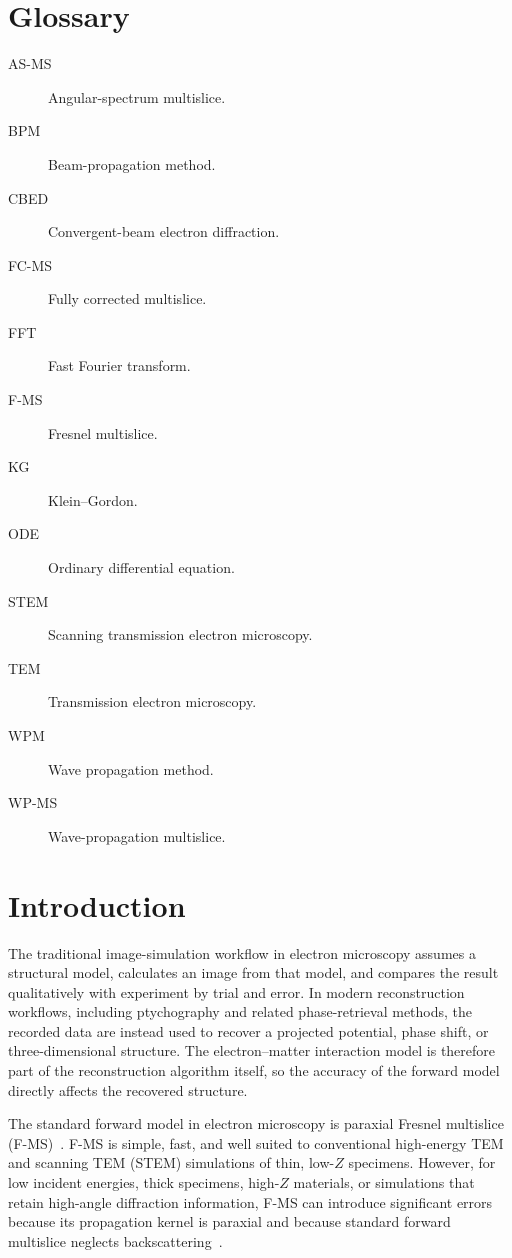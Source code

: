 \documentclass[preprint,12pt,number]{elsarticle}
\begin{document}
\section*{Glossary}
\begin{description}
\item[AS-MS] Angular-spectrum multislice.
\item[BPM] Beam-propagation method.
\item[CBED] Convergent-beam electron diffraction.
\item[FC-MS] Fully corrected multislice.
\item[FFT] Fast Fourier transform.
\item[F-MS] Fresnel multislice.
\item[KG] Klein--Gordon.
\item[ODE] Ordinary differential equation.
\item[STEM] Scanning transmission electron microscopy.
\item[TEM] Transmission electron microscopy.
\item[WPM] Wave propagation method.
\item[WP-MS] Wave-propagation multislice.
\end{description}

\section{Introduction}
\label{sec:introduction}

The traditional image-simulation workflow in electron microscopy assumes a
structural model, calculates an image from that model, and compares the result
qualitatively with experiment by trial and error. In modern reconstruction
workflows, including ptychography and related phase-retrieval methods, the
recorded data are instead used to recover a projected potential, phase shift,
or three-dimensional structure. The electron--matter interaction model is
therefore part of the reconstruction algorithm itself, so the accuracy of the
forward model directly affects the recovered structure. 

The standard forward model in electron microscopy is paraxial Fresnel multislice
(F-MS)~\cite{cowley1957scattering,ishizuka1977practical}. F-MS is simple, fast, and
well suited to conventional high-energy TEM and scanning TEM (STEM) simulations of thin,
low-$Z$ specimens. However, for low incident energies, thick specimens, high-$Z$ materials, or
simulations that retain high-angle diffraction information, F-MS can introduce
significant errors because its propagation kernel is paraxial and because
standard forward multislice neglects
backscattering~\cite{RotherScheerschmidt2009,hillier_role_2017,WackerSchroeder2015,ming2013pcms}.
\end{document}

